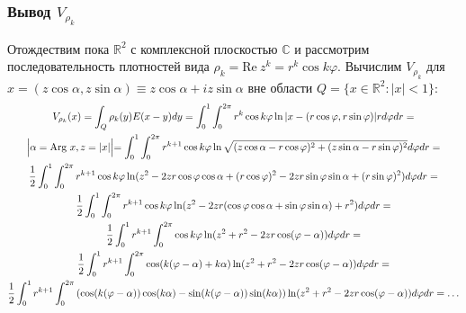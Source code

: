 \documentclass[a4paper, 12pt]{article}
\newcommand{\R}[1]{\mathbb{R}^#1}
\begin{document}
\subsubsection{Вывод $V_{\rho_k}$}
Отождествим пока $\R{2}$ с комплексной плоскостью $\mathbb{C}$ и рассмотрим последовательность плотностей вида $\rho_k=\text{Re}\ z^k=r^k \cos k\varphi$.
Вычислим $V_{\rho_k}$ для $x=(z \cos\alpha,z \sin \alpha) \equiv z \cos\alpha + i z \sin \alpha$ вне области $Q= \{x \in \R{2}: |x|<1 \}$:
\begin{multline}
    V_{\rho_k}(x)= \int_Q \rho_k(y) E(x-y) dy= \int_0^1 \int_0^{2 \pi} r^k \cos k\varphi \ln |x-(r \cos \varphi, r \sin\varphi)| r d\varphi dr =\\
\Bigl|\alpha = \text{Arg}\ x, z=|x| \Bigl|=
\int_0^1 \int_0^{2 \pi} r^{k+1} \cos k\varphi \ln \sqrt{(z\cos \alpha-r \cos \varphi)^2+(z\sin \alpha-r \sin\varphi)^2} d\varphi dr=\\
\frac{1}{2} \int_0^1 \int_0^{2 \pi} r^{k+1} \cos k\varphi \ln(z^2 - 2z r \cos\varphi \cos \alpha +(r \cos \varphi)^2 - 2z r \sin \varphi \sin \alpha +(r \sin \varphi)^2) d\varphi dr =\\
\frac{1}{2} \int_0^1 \int_0^{2 \pi} r^{k+1} \cos k\varphi \ln(z^2-2zr(\cos \varphi \cos \alpha + \sin \varphi \sin \alpha)+r^{2})d\varphi dr=\\
\frac{1}{2} \int_0^1 r^{k+1}\int_0^{2 \pi}  \cos k\varphi \ln(z^2 + r^{2} - 2zr \cos (\varphi -\alpha)) d\varphi dr=\\
\frac{1}{2} \int_0^1 r^{k+1}\int_0^{2 \pi}\cos (k(\varphi -\alpha)+k\alpha)\ln(z^2 + r^{2} - 2zr \cos (\varphi -\alpha)) d\varphi dr= \\
\frac{1}{2} \int_0^1 r^{k+1}\int_0^{2 \pi}\left(\cos (k(\varphi -\alpha)) \cos(k\alpha) - \sin (k(\varphi -\alpha)) \sin(k\alpha)\right) \ln(z^2 + r^{2} - 2zr \cos (\varphi -\alpha)) d\varphi dr=\dots
\end{multline}
\end{document}
